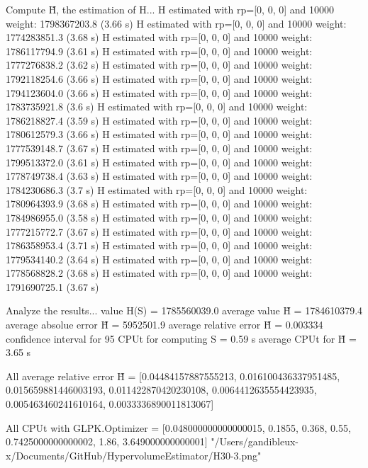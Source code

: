 Compute H̃, the estimation of H...
  H estimated with rp=[0, 0, 0] and 10000 weight:  1798367203.8  (3.66 s)
  H estimated with rp=[0, 0, 0] and 10000 weight:  1774283851.3  (3.68 s)
  H estimated with rp=[0, 0, 0] and 10000 weight:  1786117794.9  (3.61 s)
  H estimated with rp=[0, 0, 0] and 10000 weight:  1777276838.2  (3.62 s)
  H estimated with rp=[0, 0, 0] and 10000 weight:  1792118254.6  (3.66 s)
  H estimated with rp=[0, 0, 0] and 10000 weight:  1794123604.0  (3.66 s)
  H estimated with rp=[0, 0, 0] and 10000 weight:  1783735921.8  (3.6 s)
  H estimated with rp=[0, 0, 0] and 10000 weight:  1786218827.4  (3.59 s)
  H estimated with rp=[0, 0, 0] and 10000 weight:  1780612579.3  (3.66 s)
  H estimated with rp=[0, 0, 0] and 10000 weight:  1777539148.7  (3.67 s)
  H estimated with rp=[0, 0, 0] and 10000 weight:  1799513372.0  (3.61 s)
  H estimated with rp=[0, 0, 0] and 10000 weight:  1778749738.4  (3.63 s)
  H estimated with rp=[0, 0, 0] and 10000 weight:  1784230686.3  (3.7 s)
  H estimated with rp=[0, 0, 0] and 10000 weight:  1780964393.9  (3.68 s)
  H estimated with rp=[0, 0, 0] and 10000 weight:  1784986955.0  (3.58 s)
  H estimated with rp=[0, 0, 0] and 10000 weight:  1777215772.7  (3.67 s)
  H estimated with rp=[0, 0, 0] and 10000 weight:  1786358953.4  (3.71 s)
  H estimated with rp=[0, 0, 0] and 10000 weight:  1779534140.2  (3.64 s)
  H estimated with rp=[0, 0, 0] and 10000 weight:  1778568828.2  (3.68 s)
  H estimated with rp=[0, 0, 0] and 10000 weight:  1791690725.1  (3.67 s)

Analyze the results...
  value H(S)                  = 1785560039.0 
  average value H̃             = 1784610379.4 
  average absolue error H̃     = 5952501.9 
  average relative error H̃    = 0.003334 
  confidence interval for 95%
  CPUt for computing S         = 0.59 s
  average CPUt for H̃           = 3.65 s

All average relative error H̃ = [0.04484157887555213, 0.016100436337951485, 0.015659881446003193, 0.011422870420230108, 0.0064412635554423935, 0.005463460241610164, 0.0033336890011813067]

All CPUt with GLPK.Optimizer = [0.048000000000000015, 0.1855, 0.368, 0.55, 0.7425000000000002, 1.86, 3.649000000000001]
"/Users/gandibleux-x/Documents/GitHub/HypervolumeEstimator/H30-3.png"